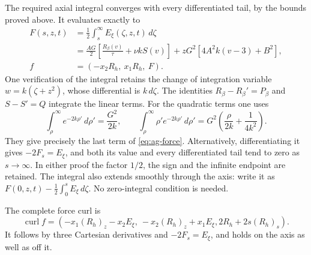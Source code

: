 The required axial integral converges with every differentiated tail,
by the bounds proved above.  It evaluates exactly to
\begin{equation}\label{eq:ag-force}
 \begin{split}
 F(s,z,t)&=\frac12\int_s^\infty E_\xi(\zeta,z,t)\,d\zeta\\
 &=\frac{A G}{2}\left[\frac{R_\beta(v)}{\tau}+\nu kS(v)\right]
       +zG^2\left[4A^2k(v-3)+B^2\right],\\
 f&=(-x_2R_h,\ x_1R_h,\ F).
 \end{split}
\end{equation}
One verification of the integral retains the change of integration
variable \(w=k(\zeta+z^2)\), whose differential is \(k\,d\zeta\).
The identities \(R_\beta-R_\beta'=P_\beta\) and \(S-S'=Q\)
integrate the linear terms.  For the quadratic terms one uses
\[
 \int_\rho^\infty e^{-2k\rho'}\,d\rho'=\frac{G^2}{2k},\qquad
 \int_\rho^\infty \rho'e^{-2k\rho'}\,d\rho'
       =G^2\left(\frac{\rho}{2k}+\frac1{4k^2}\right).
\]
They give precisely the last term of \eqref{eq:ag-force}.
Alternatively, differentiating it gives \(-2F_s=E_\xi\), and both
its value and every differentiated tail tend to zero as \(s\to\infty\).
In either proof the factor \(1/2\), the sign and the infinite endpoint
are retained.  The integral also extends smoothly through the axis:
write it as \(F(0,z,t)-\tfrac12\int_0^s E_\xi\,d\zeta\).
No zero-integral condition is needed.

The complete force curl is
\begin{equation}\label{eq:ag-curl-force}
 \operatorname{curl}f=
 (-x_1(R_h)_z-x_2E_\xi,\ -x_2(R_h)_z+x_1E_\xi,
  2R_h+2s(R_h)_s).
\end{equation}
It follows by three Cartesian derivatives and \(-2F_s=E_\xi\), and
holds on the axis as well as off it.

